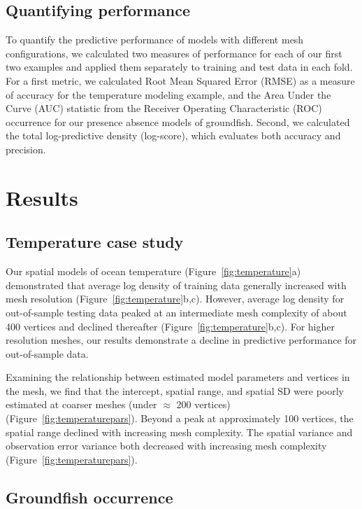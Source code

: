 \documentclass[11pt]{article}
\begin{document}
\subsection{Quantifying performance}

To quantify the predictive performance of models with different mesh
configurations, we calculated two measures of performance for each of our first
two examples and applied them separately to training and test data in each
fold. For a first metric, we calculated Root Mean Squared Error (RMSE) as a
measure of accuracy for the temperature modeling example, and the Area Under
the Curve (AUC) statistic from the Receiver Operating Characteristic (ROC)
occurrence for our presence absence models of groundfish. Second, we calculated
the total log-predictive density (log-score), which evaluates both accuracy and
precision.

\section{Results}\label{results}

\subsection{Temperature case study}\label{temperature-case-study}

Our spatial models of ocean temperature (Figure~\ref{fig:temperature}a)
demonstrated that average log density of training data generally increased with
mesh resolution (Figure~\ref{fig:temperature}b,c). However, average log density for out-of-sample
testing data peaked at an intermediate mesh complexity of about 400 vertices
and declined thereafter (Figure~\ref{fig:temperature}b,c). For higher resolution meshes, our
results demonstrate a decline in predictive performance for out-of-sample data.

Examining the relationship between estimated model parameters and vertices in
the mesh, we find that the intercept, spatial range, and spatial SD were poorly
estimated at coarser meshes (under $\approx$ 200 vertices)
(Figure~\ref{fig:temperaturepars}). Beyond a peak at approximately 100
vertices, the spatial range declined with increasing mesh complexity. The
spatial variance and observation error variance both decreased with increasing
mesh complexity (Figure~\ref{fig:temperaturepars}).

\subsection{Groundfish occurrence}\label{groundfish-occurrence}
\end{document}
